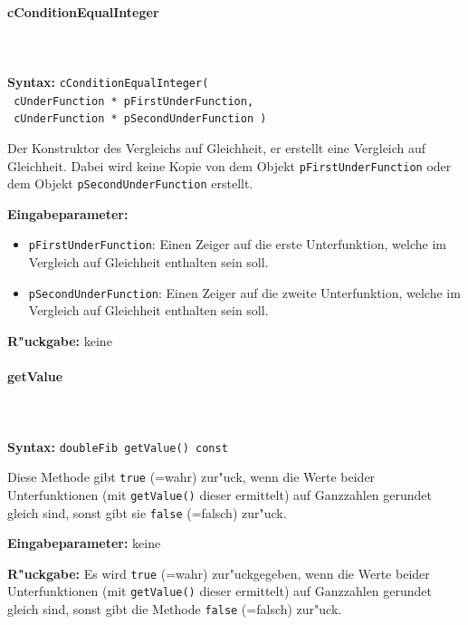 \paragraph{cConditionEqualInteger}

\ \\\\\noindent
\textbf{Syntax:} \verb|cConditionEqualInteger(| \\\verb| cUnderFunction * pFirstUnderFunction,| \\\verb| cUnderFunction * pSecondUnderFunction )|

\bigskip\noindent
Der Konstruktor des Vergleichs auf Gleichheit, er erstellt eine Vergleich auf Gleichheit. Dabei wird keine Kopie von dem Objekt \verb|pFirstUnderFunction| oder dem Objekt \verb|pSecondUnderFunction| erstellt.

\bigskip\noindent
\textbf{Eingabeparameter:}
\begin{itemize}
 \item \verb|pFirstUnderFunction|: Einen Zeiger auf die erste Unterfunktion, welche im Vergleich auf Gleichheit enthalten sein soll.
 \item \verb|pSecondUnderFunction|: Einen Zeiger auf die zweite Unterfunktion, welche im Vergleich auf Gleichheit enthalten sein soll.
\end{itemize}

\bigskip\noindent
\textbf{R"uckgabe:} keine


\paragraph{getValue}

\ \\\\\noindent
\textbf{Syntax:} \verb|doubleFib getValue() const|

\bigskip\noindent
Diese Methode gibt \verb|true| (=wahr) zur"uck, wenn die Werte beider Unterfunktionen (mit \verb|getValue()| dieser ermittelt) auf Ganzzahlen gerundet gleich sind, sonst gibt sie \verb|false| (=falsch) zur"uck.

\bigskip\noindent
\textbf{Eingabeparameter:} keine

\bigskip\noindent
\textbf{R"uckgabe:} Es wird \verb|true| (=wahr) zur"uckgegeben, wenn die Werte beider Unterfunktionen (mit \verb|getValue()| dieser ermittelt) auf Ganzzahlen gerundet gleich sind, sonst gibt die Methode \verb|false| (=falsch) zur"uck.


